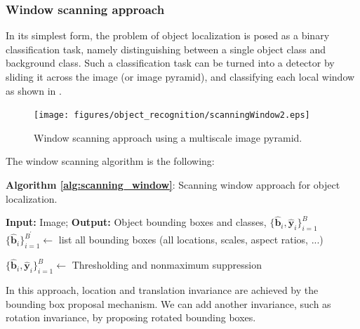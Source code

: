\subsubsection{Window scanning approach}
In its simplest form, the problem of object localization is posed as a binary classification task, namely distinguishing between a single object class and background class. Such a classification task can be turned into a detector by sliding it across the image (or image pyramid), and classifying each local window as shown in \fig{\ref{fig:scanningWindow2}}.

\begin{figure}[h]
\centerline{
\texttt{[image: figures/object\_recognition/scanningWindow2.eps]}
}
\caption{Window scanning approach using a multiscale image pyramid.}
\label{fig:scanningWindow2}
\end{figure}

The window scanning algorithm is the following:
\begin{algorithm}[h]
\SetAlgoVlined
\DontPrintSemicolon
\caption{{\bf Algorithm \ref{alg:scanning_window}}: Scanning window approach for object localization.}
\fakealgorithmcaption{}
\label{alg:scanning_window}
{\bf Input:} Image;
{\bf Output:} Object bounding boxes and classes, $\{\hat{\mathbf{b}}_i, \hat{\mathbf{y}}_i\}_{i=1}^B$\;
$\{\hat{\mathbf{b}}_i\}_{i=1}^{B^{\prime}} \leftarrow$ list all bounding boxes (all locations, scales, aspect ratios, ...)\;

$\{\hat{\mathbf{b}}_i, \hat{\mathbf{y}}_i\}_{i=1}^B \leftarrow$ Thresholding and nonmaximum suppression\;
\label{alg:object_localization}
\end{algorithm}

In this approach, location and translation invariance are achieved by the bounding box proposal mechanism. We can add another invariance, such as rotation invariance, by proposing rotated bounding boxes. 

